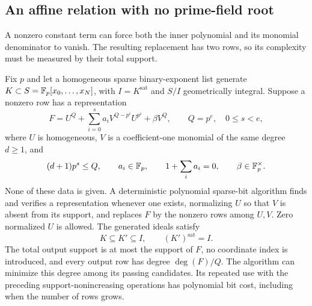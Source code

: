 \subsection{An affine relation with no prime-field root}
A nonzero constant term can force both the inner polynomial and its
monomial denominator to vanish. The resulting replacement has two
rows, so its complexity must be measured by their total support.

\begin{theorem}
\label{sp:thm:affine-preprocessing}
Fix $p$ and let a homogeneous sparse binary-exponent list generate
$K\subset S=\mathbb F_p[x_0,\ldots,x_N]$, with $I=K^{\mathrm{sat}}$ and
$S/I$ geometrically integral. Suppose a nonzero row has a representation
\begin{equation}
 F=U^Q+\sum_{i=0}^s a_iV^{Q-p^i}U^{p^i}+\beta V^Q,
 \qquad Q=p^e,\quad 0\le s<e,
 \label{sp:eq:affine-relation}
\end{equation}
where $U$ is homogeneous, $V$ is a coefficient-one monomial of the
same degree $d\ge1$, and
\[
 (d+1)p^s\le Q,\qquad a_i\in\mathbb F_p,\qquad
 1+\sum_i a_i=0,\qquad \beta\in\mathbb F_p^\times.
\]
None of these data is given. A deterministic polynomial sparse-bit
algorithm finds and verifies a representation whenever one exists,
normalizing $U$ so that $V$ is absent from its support, and replaces
$F$ by the nonzero rows among $U,V$. Zero normalized $U$ is allowed.
The generated ideals satisfy
\[
 K\subseteq K'\subseteq I,\qquad (K')^{\mathrm{sat}}=I.
\]
The total output support is at most the support of $F$, no coordinate
index is introduced, and every output row has degree $\deg(F)/Q$.
The algorithm can minimize this degree among its passing candidates.
Its repeated use with the preceding support-nonincreasing operations
has polynomial bit cost, including when the number of rows grows.
\end{theorem}
